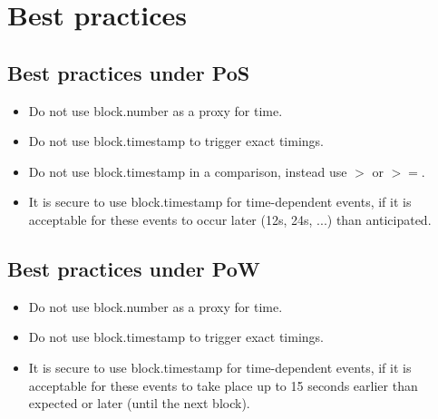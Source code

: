 %
%
%
%

\section{Best practices}
\subsection{Best practices under PoS}
\begin{itemize}
  \item Do not use block.number as a proxy for time.
  \item Do not use block.timestamp to trigger exact timings.
  \item Do not use block.timestamp in a comparison, instead use $>$ or $>=$.
  \item It is secure to use block.timestamp for time-dependent events, if it is acceptable for these events to occur later (12s, 24s, ...) than anticipated. \\
\end{itemize}

\subsection{Best practices under PoW}
\begin{itemize}
  \item Do not use block.number as a proxy for time.
  \item Do not use block.timestamp to trigger exact timings.
  \item It is secure to use block.timestamp for time-dependent events, if it is acceptable for these events to take place up to 15 seconds earlier than expected or later (until the next block). \\
\end{itemize}

